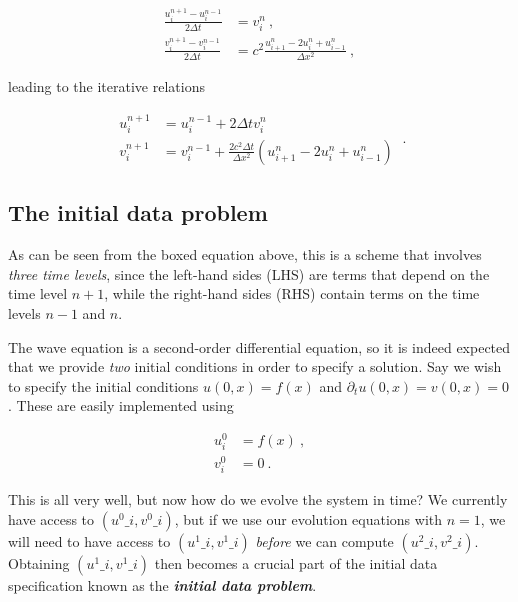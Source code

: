 \documentclass[a4paper,11pt]{article}
\begin{document}
\begin{equation}
\begin{aligned}
\frac{u^{n+1}_{i}-u^{n-1}_{i}}{2\Delta t} &= v^{n}_{i}\ ,\\
\frac{v^{n+1}_{i}-v^{n-1}_{i}}{2\Delta t} &= c^{2}\frac{u^{n}_{i+1}-2u^{n}_{i}+u^{n}_{i-1}}{\Delta x^{2}}\ ,
\end{aligned}
\end{equation}

\noindent leading to the iterative relations

\begin{equation}
\boxed{
\begin{aligned}
u^{n+1}_{i} &= u^{n-1}_{i} + 2\Delta t v^{n}_{i}\\
v^{n+1}_{i} &= v^{n-1}_{i} + \frac{2c^{2}\Delta t}{\Delta x^{2}}\left(u^{n}_{i+1}-2u^{n}_{i}+u^{n}_{i-1}\right)
\end{aligned}
}\ .
\end{equation}

\subsection{The initial data problem}

As can be seen from the boxed equation above, this is a scheme that involves \emph{three time levels}, since the left-hand sides (LHS) are terms that depend on the time level $n+1$, while the right-hand sides (RHS) contain terms on the time levels $n-1$ and $n$.

The wave equation is a second-order differential equation, so it is indeed expected that we provide \emph{two} initial conditions in order to specify a solution. Say we wish to specify the initial conditions $u(0,x) = f(x)$ and $\partial_{t}u(0,x) = v(0,x) = 0$. These are easily implemented using

\begin{equation}
\begin{aligned}
u_{i}^{0} &= f(x)\ ,\\
v_{i}^{0} &= 0\ .
\end{aligned}
\end{equation}

This is all very well, but now how do we evolve the system in time? We currently have access to $\left(u^{0}\_{i},v^{0}\_{i}\right)$, but if we use our evolution equations with $n=1$, we will need to have access to $\left(u^{1}\_{i},v^{1}\_{i}\right)$ \emph{before} we can compute $\left(u^{2}\_{i},v^{2}\_{i}\right)$. Obtaining $\left(u^{1}\_{i},v^{1}\_{i}\right)$ then becomes a crucial part of the initial data specification known as the \emph{\textbf{initial data problem}}.
\end{document}
